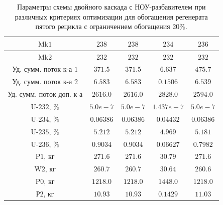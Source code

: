 \begin{table}
\begin{tabular}{ccccc}
        $\text{Mk1}$ & $238$ & $238$ & $234$ & $236$\\ \hline
        $\text{Mk2}$ & $232$ & $232$ & $232$ & $232$\\ \hline
        $\text{Уд. сумм. поток к-а 1}$ & $371.5$ & $371.5$ & $6.637$ & $475.7$\\ \hline
        $\text{Уд. сумм. поток к-а 2}$ & $6.583$ & $6.583$ & $0.1506$ & $6.539$\\ \hline
        $\text{Уд. сумм. поток доп. к-а}$ & $2616.0$ & $2616.0$ & $2828.0$ & $2594.0$\\ \hline
        $\text{U-232, \%}$ & $5.0e-7$ & $5.0e-7$ & $1.437e-7$ & $5.0e-7$\\ \hline
        $\text{U-234, \%}$ & $0.06386$ & $0.06386$ & $0.04432$ & $0.06386$\\ \hline
        $\text{U-235, \%}$ & $5.212$ & $5.212$ & $4.969$ & $5.181$\\ \hline
        $\text{U-236, \%}$ & $0.9034$ & $0.9034$ & $0.06627$ & $0.7982$\\ \hline
        $\text{P1, кг}$ & $271.6$ & $271.6$ & $30.79$ & $271.6$\\ \hline
        $\text{W2, кг}$ & $260.7$ & $260.7$ & $30.64$ & $260.6$\\ \hline
        $\text{P0, кг}$ & $1218.0$ & $1218.0$ & $1448.0$ & $1218.0$\\ \hline
        $\text{Р2, кг}$ & $10.93$ & $10.93$ & $0.1429$ & $11.03$\\ \hline
    \end{tabular}              
\caption{Параметры схемы двойного каскада с НОУ-разбавителем при различных критериях оптимизации для обогащения регенерата пятого рецикла с ограничением обогащения 20\%.{\label{2opt5_20}}}
\end{table}

